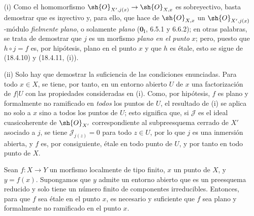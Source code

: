 (i) Como el homomorfismo $\sh{O}_{X',j(x)}\to\sh{O}_{X,x}$ es sobreyectivo, basta demostrar que es inyectivo y, para ello, que hace de $\sh{O}_{X,x}$ un $\sh{O}_{X',j(x)}$-módulo \emph{fielmente plano}, o solamente \emph{plano} ($\mathbf 0_{\mathrm I}$, 6.5.1 y 6.6.2); en otras palabras, se trata de demostrar que $j$ es un morfismo \emph{plano en el punto} $x$; pero, puesto que $h\circ j=f$ es, por hipótesis, plano en el punto $x$ y que $h$ es étale, esto se sigue de (18.4.10) y (18.4.11, (i)).

(ii) Solo hay que demostrar la suficiencia de las condiciones enunciadas. Para todo $x\in X$, se tiene, por tanto, en un entorno abierto $U$ de $x$ una factorización de $f|U$ con las propiedades consideradas en (i). Como, por hipótesis, $f$ es plano y formalmente no ramificado en \emph{todos} los puntos de $U$, el resultado de (i) se aplica no solo a $x$ sino a todos los puntos de $U$; esto significa que, si $\mathscr J$ es el ideal cuasicoherente de $\sh{O}_{X'}$ correspondiente al subpreesquema cerrado de $X'$ asociado a $j$, se tiene $\mathscr J_{j(z)}=0$ para todo $z\in U$, por lo que $j$ es una inmersión abierta, y $f$ es, por consiguiente, étale en todo punto de $U$, y por tanto en todo punto de $X$.

\begin{corollary}[18.4.13]
\label{IV.18.4.13}
Sean $f:X\to Y$ un morfismo localmente de tipo finito, $x$ un punto de $X$, y $y=f(x)$. Supongamos que $y$ admite un entorno abierto que es un preesquema reducido y solo tiene un número finito de componentes irreducibles. Entonces, para que $f$ sea étale en el punto $x$, es necesario y suficiente que $f$ sea plano y formalmente no ramificado en el punto $x$.
\end{corollary}

